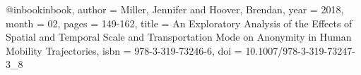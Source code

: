 @inbook{inbook,
author = {Miller, Jennifer and Hoover, Brendan},
year = {2018},
month = {02},
pages = {149-162},
title = {An Exploratory Analysis of the Effects of Spatial and Temporal Scale and Transportation Mode on Anonymity in Human Mobility Trajectories},
isbn = {978-3-319-73246-6},
doi = {10.1007/978-3-319-73247-3_8}
}
